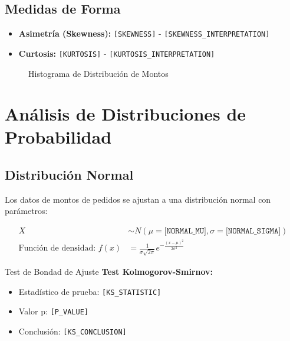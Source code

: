 \documentclass[12pt,a4paper]{article}
\begin{document}
\subsection{Medidas de Forma}

\begin{itemize}
    \item \textbf{Asimetría (Skewness):} \texttt{[SKEWNESS]} - \texttt{[SKEWNESS\_INTERPRETATION]}
    \item \textbf{Curtosis:} \texttt{[KURTOSIS]} - \texttt{[KURTOSIS\_INTERPRETATION]}
\end{itemize}

\begin{figure}[H]
\centering
{}
\caption{Histograma de Distribución de Montos}
\label{fig:histogram}
\end{figure}

\section{\textcolor{primaryblue}{Análisis de Distribuciones de Probabilidad}}

\subsection{Distribución Normal}

Los datos de montos de pedidos se ajustan a una distribución normal con parámetros:

\begin{align}
X &\sim N(\mu = \texttt{[NORMAL\_MU]}, \sigma = \texttt{[NORMAL\_SIGMA]}) \\
\text{Función de densidad: } f(x) &= \frac{1}{\sigma\sqrt{2\pi}} e^{-\frac{(x-\mu)^2}{2\sigma^2}}
\end{align}

\begin{successbox}{Test de Bondad de Ajuste}
\textbf{Test Kolmogorov-Smirnov:}
\begin{itemize}
    \item Estadístico de prueba: \texttt{[KS\_STATISTIC]}
    \item Valor p: \texttt{[P\_VALUE]}
    \item Conclusión: \texttt{[KS\_CONCLUSION]}
\end{itemize}
\end{successbox}
\end{document}
